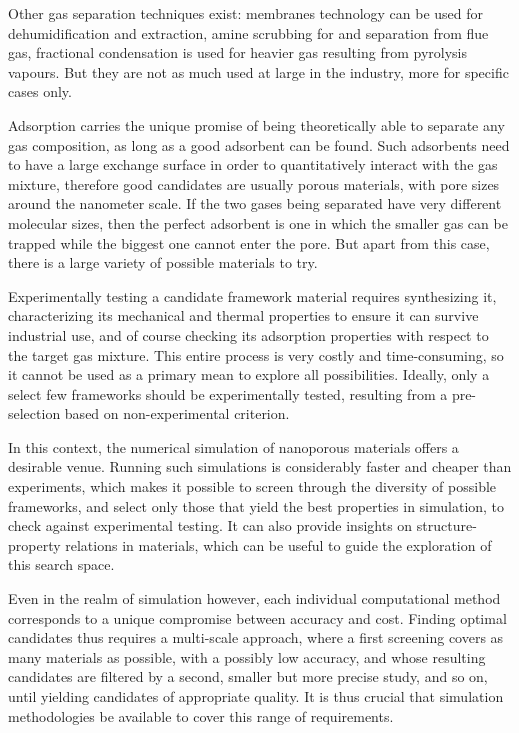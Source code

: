 Other gas separation techniques exist: membranes technology can be used for dehumidification and  extraction, amine scrubbing for  and  separation from flue gas, fractional condensation is used for heavier gas resulting from pyrolysis vapours. But they are not as much used at large in the industry, more for specific cases only.

Adsorption carries the unique promise of being theoretically able to separate any gas composition, as long as a good adsorbent can be found. Such adsorbents need to have a large exchange surface in order to quantitatively interact with the gas mixture, therefore good candidates are usually porous materials, with pore sizes around the nanometer scale. If the two gases being separated have very different molecular sizes, then the perfect adsorbent is one in which the smaller gas can be trapped while the biggest one cannot enter the pore. But apart from this case, there is a large variety of possible materials to try.

Experimentally testing a candidate framework material requires synthesizing it, characterizing its mechanical and thermal properties to ensure it can survive industrial use, and of course checking its adsorption properties with respect to the target gas mixture. This entire process is very costly and time-consuming, so it cannot be used as a primary mean to explore all possibilities. Ideally, only a select few frameworks should be experimentally tested, resulting from a pre-selection based on non-experimental criterion.

In this context, the numerical simulation of nanoporous materials offers a desirable venue. Running such simulations is considerably faster and cheaper than experiments, which makes it possible to screen through the diversity of possible frameworks, and select only those that yield the best properties in simulation, to check against experimental testing. It can also provide insights on structure-property relations in materials, which can be useful to guide the exploration of this search space.

Even in the realm of simulation however, each individual computational method corresponds to a unique compromise between accuracy and cost. Finding optimal candidates thus requires a multi-scale approach, where a first screening covers as many materials as possible, with a possibly low accuracy, and whose resulting candidates are filtered by a second, smaller but more precise study, and so on, until yielding candidates of appropriate quality. It is thus crucial that simulation methodologies be available to cover this range of requirements.

